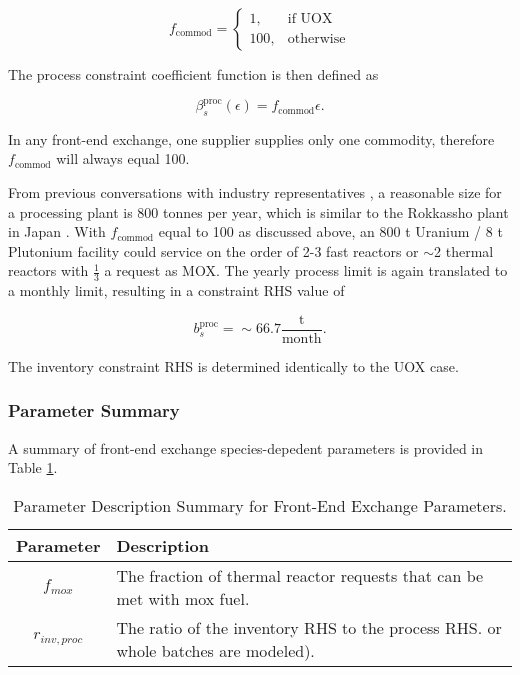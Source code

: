 \begin{equation}\label{eqn:fissfactor}
    f_{\text{commod}} =
    \begin{cases}
    1,& \text{if UOX}\\
    100,              & \text{otherwise}
    \end{cases}
\end{equation}

The process constraint coefficient function is then defined as

\begin{equation}
\beta^{\text{proc}}_s(\epsilon) = f_{\text{commod}} \epsilon. 
\end{equation}

In any front-end exchange, one supplier supplies only one commodity, therefore
$f_{\text{commod}}$ will always equal 100.

From previous conversations with industry representatives \cite{murraycomm}, a
reasonable size for a processing plant is 800 tonnes per year, which is similar
to the Rokkassho plant in Japan \cite{heinonen2010}. With $f_{\text{commod}}$
equal to 100 as discussed above, an 800 t Uranium / 8 t Plutonium facility could
service on the order of 2-3 fast reactors or $\sim$2 thermal reactors with
$\frac{1}{3}$ a request as MOX. The yearly process limit is again translated to
a monthly limit, resulting in a constraint RHS value of

\begin{equation}
b^{\text{proc}}_s = \sim 66.7 \frac{\text{t}}{\text{month}}.
\end{equation}

The inventory constraint RHS is determined identically to the UOX case.

\subsubsection{Parameter Summary}

A summary of front-end exchange species-depedent parameters is provided in Table
\ref{tbl:front_params}.

\begin{table}[h]
\centering
\caption{Parameter Description Summary for Front-End Exchange Parameters.}
\label{tbl:front_params}
\begin{tabularx}{\columnwidth-10pt}{|c|X|} %
\hline
Parameter    & 
Description
\\ \hline
$f_{mox}$     & 
The fraction of thermal reactor requests that can be met with mox fuel.
\\ \hline
$r_{inv, proc}$   & 
The ratio of the inventory RHS to the process RHS.
or whole batches are modeled).  
\\ \hline
\end{tabularx}
\end{table}

